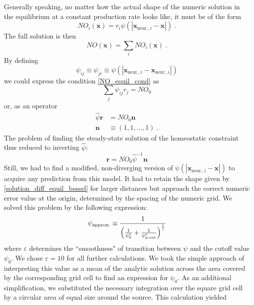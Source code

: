 \documentclass[10pt,a4paper]{article}
\begin{document}
Generally speaking, no matter how the actual shape of the numeric solution in the equilibrium at a constant production rate looks like, it must be of the form
\begin{equation}
NO_i(\mathbf{x}) = r_i \psi (|\mathbf{x}_{\mathrm{ neur.},i}-\mathbf{x}|) \; . \label{general_diff_interaction}
\end{equation}
The full solution is then
\begin{equation}
NO(\mathbf{x}) = \sum_i NO_i(\mathbf{x})\;.
\label{full_sol_diff_equil}
\end{equation}
By defining
\begin{equation}
\psi_{ij} \equiv \psi_{ji} \equiv \psi (|\mathbf{x}_{\mathrm{ neur.},i}-\mathbf{x}_{\mathrm{ neur.},i}|)
\label{interact_matrix_elements}
\end{equation}
we could express the condition \eqref{NO_equil_cond} as
\begin{equation}
\sum_j \psi_{ij} r_j = NO_0
\label{NO_equil_cond_interact_matrix}
\end{equation}
or, as an operator
\begin{align}
\hat{\psi}\mathbf{r} &= NO_0 \mathbf{n} \label{NO_equil_cond_interact_matrix_operator} \\
\mathbf{n}&\equiv (1,1,...,1) \; .
\end{align}
The problem of finding the steady-state solution of the homeostatic constraint thus reduced to inverting $\hat{\psi}$:
\begin{equation}
\mathbf{r} = NO_0 \hat{\psi}^{-1} \mathbf{n}
\label{NO_euqil_cond_interact_matrix_operator_solve}
\end{equation}
Still, we had to find a modified, non-diverging version of $\mathrm{\psi (|\mathbf{x}_{\mathrm{ neur.},i}-\mathbf{x}|)}$ to acquire any prediction from this model. It had to retain the shape given by \eqref{solution_diff_equil_bessel} for larger distances but approach the correct numeric error value at the origin, determined by the spacing of the numeric grid. We solved this problem by the following expression:
\begin{equation}
\psi_{\rm approx.} \equiv \frac{1}{\left(\frac{1}{\psi_0^\varepsilon} + \frac{1}{\psi_{\rm point}^\varepsilon}\right)^{\frac{1}{\varepsilon}}}
\label{Numeric_Solution_Expression_Trick}
\end{equation}
where $\varepsilon$ determines the ``smoothness" of transition between $\psi$ and the cutoff value $\psi_0$. We chose $\varepsilon=10$ for all further calculations. We took the simple approach of interpreting this value as a mean of the analytic solution across the area covered by the corresponding grid cell to find an expression for $\mathrm{\psi_0}$. As an additional simplification, we substituted the necessary integration over the square grid cell by a circular area of equal size around the source. This calculation yielded
\end{document}
